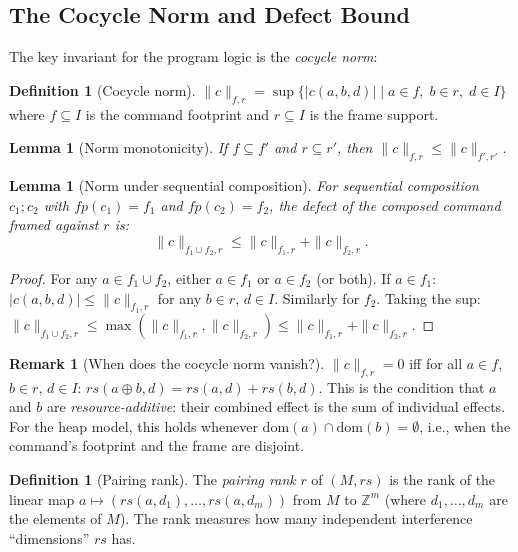 \documentclass[acmsmall,sigplan,anonymous,review,screen]{acmart}
\theoremstyle{plain}
\newtheorem{lemma}[theorem]{Lemma}
\theoremstyle{definition}
\newtheorem{definition}[theorem]{Definition}
\newtheorem{remark}[theorem]{Remark}
\newcommand{\rs}{\mathit{rs}}
\newcommand{\fp}{\mathit{fp}}
\newcommand{\norm}[1]{\|#1\|}
\begin{document}
\subsection{The Cocycle Norm and Defect Bound}
\label{sec:background:norm}

The key invariant for the program logic is the \emph{cocycle norm}:

\begin{definition}[Cocycle norm]
\label{def:cnorm}
  $\norm{c}_{f, r} = \sup\{ |c(a, b, d)| \mid a \in f,\; b \in r,\; d \in I \}$
  where $f \subseteq I$ is the command footprint and $r \subseteq I$ is
  the frame support.
\end{definition}

\begin{lemma}[Norm monotonicity]
\label{lem:norm-mono}
  If $f \subseteq f'$ and $r \subseteq r'$, then
  $\norm{c}_{f, r} \leq \norm{c}_{f', r'}$.
\end{lemma}

\begin{lemma}[Norm under sequential composition]
\label{lem:norm-seq}
  For sequential composition $c_1; c_2$ with $\fp(c_1) = f_1$ and
  $\fp(c_2) = f_2$, the defect of the composed command framed against $r$ is:
  \[
    \norm{c}_{f_1 \cup f_2, r} \leq \norm{c}_{f_1, r} + \norm{c}_{f_2, r}.
  \]
\end{lemma}
\begin{proof}
  For any $a \in f_1 \cup f_2$, either $a \in f_1$ or $a \in f_2$
  (or both).  If $a \in f_1$: $|c(a, b, d)| \leq \norm{c}_{f_1, r}$ for
  any $b \in r$, $d \in I$.  Similarly for $f_2$.  Taking the sup:
  $\norm{c}_{f_1 \cup f_2, r} \leq \max(\norm{c}_{f_1, r}, \norm{c}_{f_2, r})
  \leq \norm{c}_{f_1, r} + \norm{c}_{f_2, r}$.
\end{proof}

\begin{remark}[When does the cocycle norm vanish?]
  $\norm{c}_{f, r} = 0$ iff for all $a \in f$, $b \in r$, $d \in I$:
  $\rs(a \oplus b, d) = \rs(a, d) + \rs(b, d)$.  This is the condition
  that $a$ and $b$ are \emph{resource-additive}: their combined effect is
  the sum of individual effects.  For the heap model, this holds whenever
  $\mathrm{dom}(a) \cap \mathrm{dom}(b) = \emptyset$, i.e., when the
  command's footprint and the frame are disjoint.
\end{remark}

\begin{definition}[Pairing rank]
\label{def:rank}
  The \emph{pairing rank} $r$ of $(M, \rs)$ is the rank of the linear map
  $a \mapsto (\rs(a, d_1), \ldots, \rs(a, d_m))$ from $M$ to $\mathbb{Z}^m$
  (where $d_1, \ldots, d_m$ are the elements of $M$).  The rank measures
  how many independent interference ``dimensions'' $\rs$ has.
\end{definition}
\end{document}
